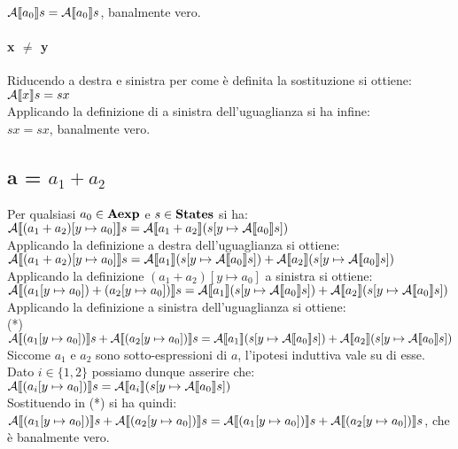 {$\mathcal{A} \llbracket a_0 \rrbracket s = \mathcal{A} \llbracket a_0 \rrbracket s$,
banalmente vero.

\paragraph{x $\neq$ y} Riducendo a destra e sinistra per come è definita la
sostituzione si ottiene:
\\

$\mathcal{A} \llbracket x \rrbracket s = s x$
\\

Applicando la definizione di  a sinistra dell'uguaglianza si ha infine:
\\

$s x = s x$,
banalmente vero.

\subsection{a = $a_1 + a_2$} Per qualsiasi $a_0 \in \textbf{Aexp}$ e $s \in \textbf{States}$ si
ha:
\\

$\mathcal{A} \llbracket (a_1 + a_2) [y \mapsto{} a_0] \rrbracket s =
\mathcal{A} \llbracket a_1 + a_2 \rrbracket (s [y \mapsto{} \mathcal{A} \llbracket a_0 \rrbracket s]) $
\\

Applicando la definizione  a destra dell'uguaglianza si ottiene:
\\

$\mathcal{A} \llbracket (a_1 + a_2) [y \mapsto{} a_0] \rrbracket s =
\mathcal{A} \llbracket a_1 \rrbracket (s [y \mapsto{} \mathcal{A} \llbracket a_0 \rrbracket s]) +
\mathcal{A} \llbracket a_2 \rrbracket (s [y \mapsto{} \mathcal{A} \llbracket a_0 \rrbracket s]) $
\\

Applicando la definizione $(a_1 + a_2)[y \mapsto{} a_0]$ a sinistra si ottiene:
\\

$\mathcal{A} \llbracket (a_1 [y \mapsto{} a_0]) + (a_2[y \mapsto{} a_0])  \rrbracket s =
\mathcal{A} \llbracket a_1 \rrbracket (s [y \mapsto{} \mathcal{A} \llbracket a_0 \rrbracket s]) +
\mathcal{A} \llbracket a_2 \rrbracket (s [y \mapsto{} \mathcal{A} \llbracket a_0 \rrbracket s]) $
\\

Applicando la definizione  a sinistra dell'uguaglianza si ottiene:
\\

(*) $\mathcal{A} \llbracket (a_1 [y \mapsto{} a_0]) \rrbracket s + \mathcal{A} \llbracket (a_2[y \mapsto{} a_0]) \rrbracket s =
\mathcal{A} \llbracket a_1 \rrbracket (s [y \mapsto{} \mathcal{A} \llbracket a_0 \rrbracket s]) +
\mathcal{A} \llbracket a_2 \rrbracket (s [y \mapsto{} \mathcal{A} \llbracket a_0 \rrbracket s]) $
\\

Siccome $a_1$ e $a_2$ sono sotto-espressioni di $a$, l'ipotesi induttiva vale
su di esse. Dato $i \in{} \{1, 2\}$ possiamo dunque asserire che:
\\

$\mathcal{A} \llbracket (a_i [y \mapsto{} a_0]) \rrbracket s =
\mathcal{A} \llbracket a_i \rrbracket (s [y \mapsto{} \mathcal{A} \llbracket a_0 \rrbracket s])$
\\

Sostituendo in (*) si ha quindi:
\\

$\mathcal{A} \llbracket (a_1 [y \mapsto{} a_0]) \rrbracket s + \mathcal{A} \llbracket (a_2[y \mapsto{} a_0])  \rrbracket s =
 \mathcal{A} \llbracket (a_1 [y \mapsto{} a_0]) \rrbracket s + \mathcal{A} \llbracket (a_2[y \mapsto{} a_0])  \rrbracket s$,
 che è banalmente vero.

}

